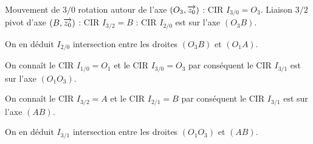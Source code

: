 \documentclass[10pt]{article}
\begin{document}
\begin{exemple}
Mouvement de $3/0$ rotation autour de l'axe $(O_3,\overrightarrow{z_0})$ : CIR $I_{3/0}=O_3$. 
Liaison $3/2$ pivot d'axe $(B,\overrightarrow{z_0})$ : CIR $I_{3/2}=B$ : CIR $I_{2/0}$ est sur l'axe $(O_3 B)$.

On en déduit $I_{2/0}$ intersection entre les droites $(O_3 B)$ et $(O_1 A)$.


On connaît le CIR $I_{1/0}=O_1$ et le CIR $I_{3/0}=O_3$ par conséquent le CIR $I_{3/1}$ est sur l'axe $(O_1O_3)$. 

On connaît le CIR $I_{3/2}=A$ et le CIR $I_{2/1}=B$ par conséquent le CIR $I_{3/1}$ est sur l'axe $(AB)$.

On en déduit $I_{3/1}$ intersection entre les droites $(O_1O_3)$ et $(AB)$.

\end{exemple}
\end{document}
